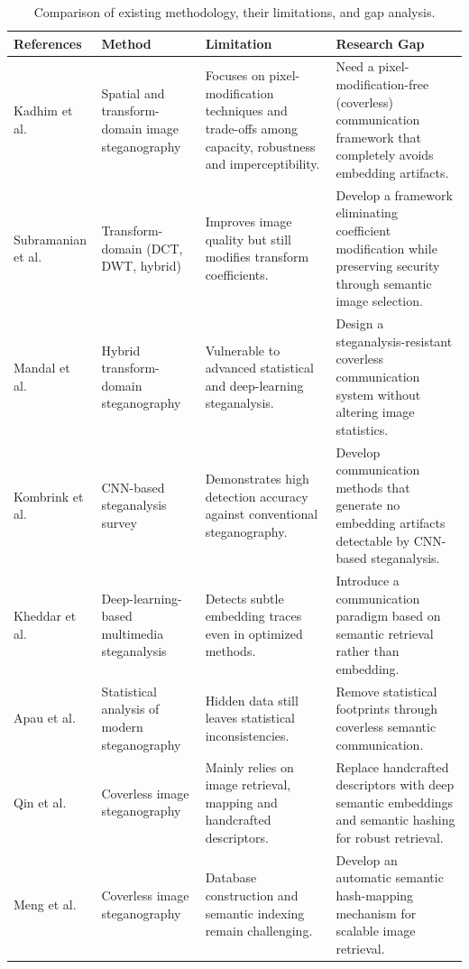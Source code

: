\documentclass[10pt,a4paper]{article}
\theoremstyle{definition}
\begin{document}
\begin{table}[t]
\centering
\caption{Comparison of existing methodology, their limitations, and gap analysis.}\label{tab:gap}
\footnotesize
\renewcommand{\arraystretch}{1.25}
\begin{tabular}{@{}p{2.15cm}p{2.55cm}p{4.05cm}p{4.25cm}@{}}
\toprule
{\normalsize\bfseries References} & {\normalsize\bfseries Method} &
{\normalsize\bfseries Limitation} & {\normalsize\bfseries Research Gap} \\
\midrule
Kadhim et al.\ \cite{kadhim} & Spatial and transform-domain image steganography & Focuses on pixel-modification techniques and trade-offs among capacity, robustness and imperceptibility. & Need a pixel-modification-free (coverless) communication framework that completely avoids embedding artifacts. \\
Subramanian et al.\ \cite{subramanian} & Transform-domain (DCT, DWT, hybrid) & Improves image quality but still modifies transform coefficients. & Develop a framework eliminating coefficient modification while preserving security through semantic image selection. \\
Mandal et al.\ \cite{mandal} & Hybrid transform-domain steganography & Vulnerable to advanced statistical and deep-learning steganalysis. & Design a steganalysis-resistant coverless communication system without altering image statistics. \\
Kombrink et al.\ \cite{kombrink} & CNN-based steganalysis survey & Demonstrates high detection accuracy against conventional steganography. & Develop communication methods that generate no embedding artifacts detectable by CNN-based steganalysis. \\
Kheddar et al.\ \cite{kheddar} & Deep-learning-based multimedia steganalysis & Detects subtle embedding traces even in optimized methods. & Introduce a communication paradigm based on semantic retrieval rather than embedding. \\
Apau et al.\ \cite{apau} & Statistical analysis of modern steganography & Hidden data still leaves statistical inconsistencies. & Remove statistical footprints through coverless semantic communication. \\
Qin et al.\ \cite{qin} & Coverless image steganography & Mainly relies on image retrieval, mapping and handcrafted descriptors. & Replace handcrafted descriptors with deep semantic embeddings and semantic hashing for robust retrieval. \\
Meng et al.\ \cite{mengReview} & Coverless image steganography & Database construction and semantic indexing remain challenging. & Develop an automatic semantic hash-mapping mechanism for scalable image retrieval. \\

\end{tabular}
\end{table}
\end{document}
